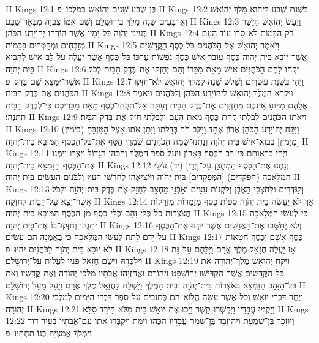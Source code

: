 II Kings 12:1	בֶּן־שֶׁבַע שָׁנִים יְהוֹאָשׁ בְּמלְכוֹ׃ {פ}
II Kings 12:2	בִּשְׁנַת־שֶׁבַע לְיֵהוּא מָלַךְ יְהוֹאָשׁ וְאַרְבָּעִים שָׁנָה מָלַךְ בִּירוּשָׁלָ͏ִם וְשֵׁם אִמּוֹ צִבְיָה מִבְּאֵר שָׁבַע׃
II Kings 12:3	וַיַּעַשׂ יְהוֹאָשׁ הַיָּשָׁר בְּעֵינֵי יְהֹוָה כּל־יָמָיו אֲשֶׁר הוֹרָהוּ יְהוֹיָדָע הַכֹּהֵן׃
II Kings 12:4	רַק הַבָּמוֹת לֹא־סָרוּ עוֹד הָעָם מְזַבְּחִים וּמְקַטְּרִים בַּבָּמוֹת׃
II Kings 12:5	וַיֹּאמֶר יְהוֹאָשׁ אֶל־הַכֹּהֲנִים כֹּל כֶּסֶף הַקֳּדָשִׁים אֲשֶׁר־יוּבָא בֵית־יְהֹוָה כֶּסֶף עוֹבֵר אִישׁ כֶּסֶף נַפְשׁוֹת עֶרְכּוֹ כּל־כֶּסֶף אֲשֶׁר יַעֲלֶה עַל לֶב־אִישׁ לְהָבִיא בֵּית יְהֹוָה׃
II Kings 12:6	יִקְחוּ לָהֶם הַכֹּהֲנִים אִישׁ מֵאֵת מַכָּרוֹ וְהֵם יְחַזְּקוּ אֶת־בֶּדֶק הַבַּיִת לְכֹל אֲשֶׁר־יִמָּצֵא שָׁם בָּדֶק׃ {פ}
II Kings 12:7	וַיְהִי בִּשְׁנַת עֶשְׂרִים וְשָׁלֹשׁ שָׁנָה לַמֶּלֶךְ יְהוֹאָשׁ לֹא־חִזְּקוּ הַכֹּהֲנִים אֶת־בֶּדֶק הַבָּיִת׃
II Kings 12:8	וַיִּקְרָא הַמֶּלֶךְ יְהוֹאָשׁ לִיהוֹיָדָע הַכֹּהֵן וְלַכֹּהֲנִים וַיֹּאמֶר אֲלֵהֶם מַדּוּעַ אֵינְכֶם מְחַזְּקִים אֶת־בֶּדֶק הַבָּיִת וְעַתָּה אַל־תִּקְחוּ־כֶסֶף מֵאֵת מַכָּרֵיכֶם כִּי־לְבֶדֶק הַבַּיִת תִּתְּנֻהוּ׃
II Kings 12:9	וַיֵּאֹתוּ הַכֹּהֲנִים לְבִלְתִּי קְחַת־כֶּסֶף מֵאֵת הָעָם וּלְבִלְתִּי חַזֵּק אֶת־בֶּדֶק הַבָּיִת׃
II Kings 12:10	וַיִּקַּח יְהוֹיָדָע הַכֹּהֵן אֲרוֹן אֶחָד וַיִּקֹּב חֹר בְּדַלְתּוֹ וַיִּתֵּן אֹתוֹ אֵצֶל הַמִּזְבֵּחַ (בימין) [מִיָּמִין] בְּבוֹא־אִישׁ בֵּית יְהֹוָה וְנָתְנוּ־שָׁמָּה הַכֹּהֲנִים שֹׁמְרֵי הַסַּף אֶת־כּל־הַכֶּסֶף הַמּוּבָא בֵית־יְהֹוָה׃
II Kings 12:11	וַיְהִי כִּרְאוֹתָם כִּי־רַב הַכֶּסֶף בָּאָרוֹן וַיַּעַל סֹפֵר הַמֶּלֶךְ וְהַכֹּהֵן הַגָּדוֹל וַיָּצֻרוּ וַיִּמְנוּ אֶת־הַכֶּסֶף הַנִּמְצָא בֵית־יְהֹוָה׃
II Kings 12:12	וְנָתְנוּ אֶת־הַכֶּסֶף הַמְתֻכָּן עַל־[יְדֵי] (יד) עֹשֵׂי הַמְּלָאכָה (הפקדים) [הַמֻּפְקָדִים] בֵּית יְהֹוָה וַיּוֹצִיאֻהוּ לְחָרָשֵׁי הָעֵץ וְלַבֹּנִים הָעֹשִׂים בֵּית יְהֹוָה׃
II Kings 12:13	וְלַגֹּדְרִים וּלְחֹצְבֵי הָאֶבֶן וְלִקְנוֹת עֵצִים וְאַבְנֵי מַחְצֵב לְחַזֵּק אֶת־בֶּדֶק בֵּית־יְהֹוָה וּלְכֹל אֲשֶׁר־יֵצֵא עַל־הַבַּיִת לְחזְקָה׃
II Kings 12:14	אַךְ לֹא יֵעָשֶׂה בֵּית יְהֹוָה סִפּוֹת כֶּסֶף מְזַמְּרוֹת מִזְרָקוֹת חֲצֹצְרוֹת כּל־כְּלִי זָהָב וּכְלִי־כָסֶף מִן־הַכֶּסֶף הַמּוּבָא בֵית־יְהֹוָה׃
II Kings 12:15	כִּי־לְעֹשֵׂי הַמְּלָאכָה יִתְּנֻהוּ וְחִזְּקוּ־בוֹ אֶת־בֵּית יְהֹוָה׃
II Kings 12:16	וְלֹא יְחַשְּׁבוּ אֶת־הָאֲנָשִׁים אֲשֶׁר יִתְּנוּ אֶת־הַכֶּסֶף עַל־יָדָם לָתֵת לְעֹשֵׂי הַמְּלָאכָה כִּי בֶאֱמֻנָה הֵם עֹשִׂים׃
II Kings 12:17	כֶּסֶף אָשָׁם וְכֶסֶף חַטָּאוֹת לֹא יוּבָא בֵּית יְהֹוָה לַכֹּהֲנִים יִהְיוּ׃ {פ}
II Kings 12:18	אָז יַעֲלֶה חֲזָאֵל מֶלֶךְ אֲרָם וַיִּלָּחֶם עַל־גַּת וַיִּלְכְּדָהּ וַיָּשֶׂם חֲזָאֵל פָּנָיו לַעֲלוֹת עַל־יְרוּשָׁלָ͏ִם׃
II Kings 12:19	וַיִּקַּח יְהוֹאָשׁ מֶלֶךְ־יְהוּדָה אֵת כּל־הַקֳּדָשִׁים אֲשֶׁר־הִקְדִּישׁוּ יְהוֹשָׁפָט וִיהוֹרָם וַאֲחַזְיָהוּ אֲבֹתָיו מַלְכֵי יְהוּדָה וְאֶת־קֳדָשָׁיו וְאֵת כּל־הַזָּהָב הַנִּמְצָא בְּאֹצְרוֹת בֵּית־יְהֹוָה וּבֵית הַמֶּלֶךְ וַיִּשְׁלַח לַחֲזָאֵל מֶלֶךְ אֲרָם וַיַּעַל מֵעַל יְרוּשָׁלָ͏ִם׃
II Kings 12:20	וְיֶתֶר דִּבְרֵי יוֹאָשׁ וְכל־אֲשֶׁר עָשָׂה הֲלוֹא־הֵם כְּתוּבִים עַל־סֵפֶר דִּבְרֵי הַיָּמִים לְמַלְכֵי יְהוּדָה׃
II Kings 12:21	וַיָּקֻמוּ עֲבָדָיו וַיִּקְשְׁרוּ־קָשֶׁר וַיַּכּוּ אֶת־יוֹאָשׁ בֵּית מִלֹּא הַיֹּרֵד סִלָּא׃
II Kings 12:22	וְיוֹזָכָר בֶּן־שִׁמְעָת וִיהוֹזָבָד בֶּן־שֹׁמֵר  עֲבָדָיו הִכֻּהוּ וַיָּמֹת וַיִּקְבְּרוּ אֹתוֹ עִם־אֲבֹתָיו בְּעִיר דָּוִד וַיִּמְלֹךְ אֲמַצְיָה בְנוֹ תַּחְתָּיו׃ {פ}
